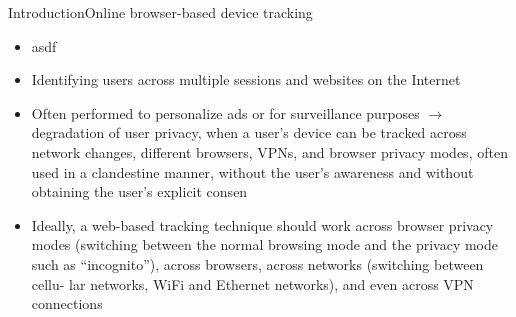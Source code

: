 \documentclass[aspectratio=169, hyperref={colorlinks=true, allcolors=SecondaryColor}, c]{beamer}
\begin{document}
\begin{frame}[fragile]{Introduction}{Online browser-based device tracking}
	\ifbeamer
		\begin{itemize}
			\item asdf
		\end{itemize}
	\else
		\begin{itemize}
			\item Identifying users across multiple sessions and websites on the Internet
			\item Often performed to personalize ads or for surveillance purposes $\rightarrow$ degradation of user privacy, when a user’s device can be tracked across network changes, different browsers, VPNs, and browser privacy modes, often used in a clandestine manner, without the user’s awareness and without obtaining the user’s explicit consen
			\item Ideally, a web-based tracking technique should work across browser privacy modes (switching between the normal browsing mode and the privacy mode such as “incognito”), across browsers, across networks (switching between cellu- lar networks, WiFi and Ethernet networks), and even across VPN connections

\end{itemize}
\end{frame}
\end{document}

